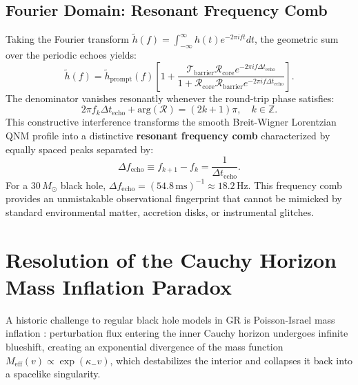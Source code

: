 \documentclass[11pt,a4paper]{article}
\begin{document}
\subsection{Fourier Domain: Resonant Frequency Comb}
Taking the Fourier transform $\tilde{h}(f) = \int_{-\infty}^{\infty} h(t) e^{-2\pi i f t} dt$, the geometric sum over the periodic echoes yields:
\begin{equation}
\tilde{h}(f) = \tilde{h}_{\mathrm{prompt}}(f) \left[ 1 + \frac{\mathcal{T}_{\mathrm{barrier}} \mathcal{R}_{\mathrm{core}} e^{-2\pi i f \Delta t_{\mathrm{echo}}}}{1 + \mathcal{R}_{\mathrm{core}} \mathcal{R}_{\mathrm{barrier}} e^{-2\pi i f \Delta t_{\mathrm{echo}}}} \right].
\label{eq:comb_formula}
\end{equation}
The denominator vanishes resonantly whenever the round-trip phase satisfies:
\begin{equation}
2\pi f_k \Delta t_{\mathrm{echo}} + \mathrm{arg}(\mathcal{R}) = (2k + 1)\pi, \quad k \in \mathbb{Z}.
\end{equation}
This constructive interference transforms the smooth Breit-Wigner Lorentzian QNM profile into a distinctive \textbf{resonant frequency comb} characterized by equally spaced peaks separated by:
\begin{equation}
\Delta f_{\mathrm{echo}} \equiv f_{k+1} - f_k = \frac{1}{\Delta t_{\mathrm{echo}}}.
\end{equation}
For a $30\,M_\odot$ black hole, $\Delta f_{\mathrm{echo}} = (54.8\,\mathrm{ms})^{-1} \approx 18.2\,\mathrm{Hz}$. This frequency comb provides an unmistakable observational fingerprint that cannot be mimicked by standard environmental matter, accretion disks, or instrumental glitches.

\section{Resolution of the Cauchy Horizon Mass Inflation Paradox}

A historic challenge to regular black hole models in GR is Poisson-Israel mass inflation \cite{Poisson1989}: perturbation flux entering the inner Cauchy horizon undergoes infinite blueshift, creating an exponential divergence of the mass function $M_{\mathrm{eff}}(v) \propto \exp(\kappa_- v)$, which destabilizes the interior and collapses it back into a spacelike singularity.
\end{document}

